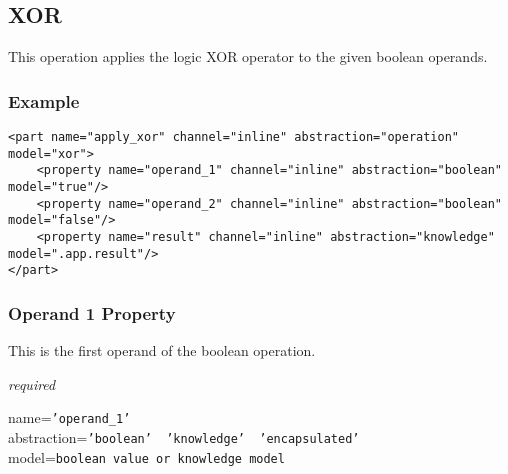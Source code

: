 %
%
%
%
%
%

\subsection{XOR}
\label{xor_heading}

This operation applies the logic XOR operator to the given boolean operands.

\subsubsection{Example}

\begin{scriptsize}
    \begin{verbatim}
<part name="apply_xor" channel="inline" abstraction="operation" model="xor">
    <property name="operand_1" channel="inline" abstraction="boolean" model="true"/>
    <property name="operand_2" channel="inline" abstraction="boolean" model="false"/>
    <property name="result" channel="inline" abstraction="knowledge" model=".app.result"/>
</part>
    \end{verbatim}
\end{scriptsize}

\subsubsection{Operand 1 Property}

This is the first operand of the boolean operation.

\emph{required}

name=\texttt{'operand\_1'}\\
abstraction=\texttt{'boolean' \vline\ 'knowledge' \vline\ 'encapsulated'}\\
model=\texttt{boolean value or knowledge model}

